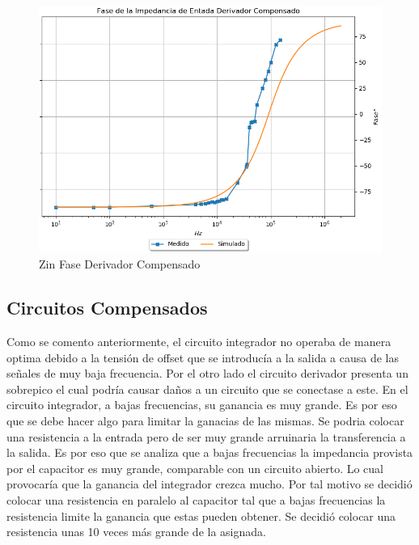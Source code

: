 \begin{figure}[H]
	\centering
	\includegraphics[width=\textwidth]{Ejercicio4/SUPERPOSICION-ZIN-DERIVADOR-COMPENSADO-FASE} 
	\caption{Zin Fase Derivador Compensado}
\end{figure}

\subsection{Circuitos Compensados}
Como se comento anteriormente, el circuito integrador no operaba de manera optima debido a la tensión de offset que se introducía a la salida a causa de las señales de muy baja frecuencia. Por el otro lado el circuito derivador presenta un sobrepico el cual podría causar daños a un circuito que se conectase a este. 
En el circuito integrador, a bajas frecuencias, su ganancia es muy grande. Es por eso que se debe hacer algo para limitar la ganacias de las mismas. Se podria colocar una resistencia a la entrada pero de ser muy grande arruinaria la transferencia a la salida. Es por eso que se analiza que a bajas frecuencias la impedancia provista por el capacitor es muy grande, comparable con un circuito abierto. Lo cual provocaría que la ganancia del integrador crezca mucho. Por tal motivo se decidió colocar una resistencia en paralelo al capacitor tal que a bajas frecuencias la resistencia limite la ganancia que estas pueden obtener. 
Se decidió colocar una resistencia unas 10 veces más grande de la asignada. 

